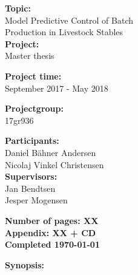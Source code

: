 \begin{minipage}[t]{0.48\textwidth}
\textbf{Topic:} \\[5pt]\hspace*{2ex}
Model Predictive Control of Batch  \\\hspace*{2ex}
Production in Livestock Stables \\

\textbf{Project:} \\[5pt]\bigskip\hspace{2ex}
Master thesis 

\textbf{Project time:} \\[5pt]\bigskip\hspace{2ex}
September 2017 - May 2018

\textbf{Projectgroup:} \\[5pt]\bigskip\hspace{2ex}
17gr936

\textbf{Participants:} \\[5pt]\hspace*{2ex}
Daniel Bähner Andersen \\\hspace*{2ex}
Nicolaj Vinkel Christensen \\

\textbf{Supervisors:} \\[5pt]\hspace*{2ex}
Jan Bendtsen \\\hspace*{2ex}
Jesper Mogensen \\\bigskip\hspace{2ex}

\vspace*{3.5cm}

\textbf{Number of pages: XX}\\
\textbf{Appendix: XX + CD} \\
\textbf{Completed \today}\\
\end{minipage}
\hfill
\begin{minipage}[t]{0.483\textwidth}
\textbf{Synopsis:} \\[5pt]
\fbox{\parbox{7cm}{\bigskip\bigskip}}
\end{minipage}

\vfill